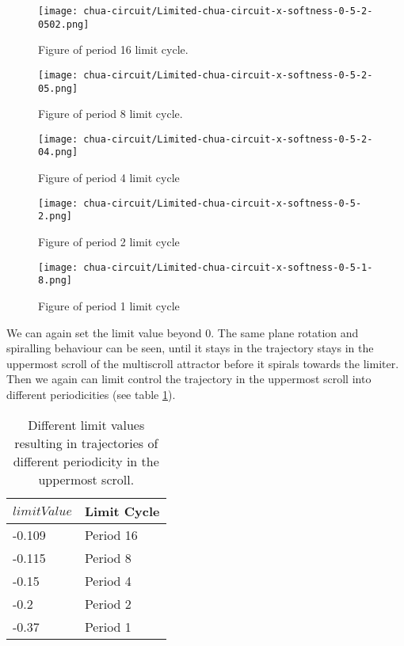 \documentclass[main]{subfiles}
\begin{document}
\begin{figure}[H]
\centering
\texttt{[image: chua-circuit/Limited-chua-circuit-x-softness-0-5-2-0502.png]}
\caption[Figure of period 16 limit cycle]{Figure of period 16 limit cycle.}
\label{figure:x-0.5-16-limit-cycle-trajectory}
\end{figure}

\begin{figure}[H]
\centering
\texttt{[image: chua-circuit/Limited-chua-circuit-x-softness-0-5-2-05.png]}
\caption[Figure of period 8 limit cycle]{Figure of period 8 limit cycle.}
\label{figure:x-0.5-8-limit-cycle-trajectory}
\end{figure}

\begin{figure}[H]
\centering
\texttt{[image: chua-circuit/Limited-chua-circuit-x-softness-0-5-2-04.png]}
\caption[Figure of period 4 limit cycle]{Figure of period 4 limit cycle}
\label{figure:x-0.5-4-limit-cycle-trajectory}
\end{figure}

\begin{figure}[H]
\centering
\texttt{[image: chua-circuit/Limited-chua-circuit-x-softness-0-5-2.png]}
\caption[Figure of period 3 limit cycle]{Figure of period 2 limit cycle}
\label{figure:x-0.5-2-limit-cycle-trajectory}
\end{figure}

\begin{figure}[H]
\centering
\texttt{[image: chua-circuit/Limited-chua-circuit-x-softness-0-5-1-8.png]}
\caption[Figure of period 1 limit cycle]{Figure of period 1 limit cycle}
\label{figure:x-0.5-1-limit-cycle-trajectory}
\end{figure}

We can again set the limit value beyond 0. The same plane rotation and spiralling behaviour can be seen, until it stays in the trajectory stays in the uppermost scroll of the multiscroll attractor before it spirals towards the limiter. %
%
Then we again can limit control the trajectory in the uppermost scroll into different periodicities (see table \ref{table:x-0.5-upperscroll-periodicities}).

\begin{table}[H]
\renewcommand{\arraystretch}{1.2}
\center
\begin{tabular}{@{}ll@{}}
	\toprule
   \(limitValue\) & Limit Cycle\\
   \midrule
   -0.109 & Period 16 \\
   -0.115 & Period 8 \\ 
   -0.15 & Period 4 \\
   -0.2  & Period 2 \\
   -0.37 & Period 1 \\
   \bottomrule
\end{tabular}
\caption[Limiter values for periodic trajectories for for an x self-limiting limiter with softness 0.13]{Different limit values resulting in trajectories of different periodicity in the uppermost scroll.}
\label{table:x-0.5-upperscroll-periodicities}
\end{table}
\end{document}
